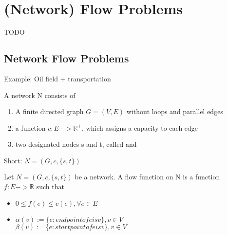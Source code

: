 \chapter{(Network) Flow Problems}

\begin{descr}
    TODO
\end{descr}

\section{Network Flow Problems}
\begin{example}
Example: Oil field + transportation

\end{example}

\begin{definition}
A network N consists of 
\begin{enumerate}
\item A finite directed graph $G=(V,E)$ without loops and parallel edges
\item a function $c: E -> \mathbb{R}^{+}$, which assigns a capacity to each edge
\item two designated nodes s and t, called  and 
\end{enumerate}
Short: $N = (G, c, \{s, t\})$
\end{definition}

\begin{definition}
Let $N = (G, c, \{s, t\})$ be a network. A flow function on N is a function $f: E -> \mathbb{R}$ such that 
\begin{itemize}
\item $ 0 \le f(e) \le c(e), \forall e \in E $
\item $ \alpha(v) := \{e: endpoint of e is v\}, v \in V$ \\
$\beta(v) := \{e: startpoint of e is v\}, v \in V$

\end{itemize}
\end{definition}